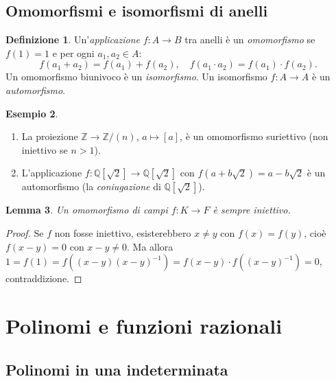\documentclass[11pt, a4paper]{book}
\theoremstyle{definition}
\newtheorem{definizione}{Definizione}[section]
\newtheorem{esempio}[definizione]{Esempio}
\theoremstyle{plain}
\newtheorem{lemma}[definizione]{Lemma}
\theoremstyle{remark}
\newcommand{\Z}{\mathbb{Z}}
\newcommand{\Q}{\mathbb{Q}}
\begin{document}
\subsection{Omomorfismi e isomorfismi di anelli}

\begin{defbox}
\begin{definizione}
Un'\emph{applicazione} $f \colon A \to B$ tra anelli è un \emph{omomorfismo} se $f(1) = 1$ e per ogni $a_1, a_2 \in A$:
\[
  f(a_1 + a_2) = f(a_1) + f(a_2), \quad f(a_1 \cdot a_2) = f(a_1) \cdot f(a_2).
\]
Un omomorfismo biunivoco è un \emph{isomorfismo}. Un isomorfismo $f \colon A \to A$ è un \emph{automorfismo}.
\end{definizione}
\end{defbox}

\begin{exbox}
\begin{esempio}
\begin{enumerate}
  \item La proiezione $\Z \to \Z/(n)$, $a \mapsto [a]$, è un omomorfismo suriettivo (non iniettivo se $n > 1$).
  \item L'applicazione $f \colon \Q[\sqrt{2}] \to \Q[\sqrt{2}]$ con $f(a + b\sqrt{2}) = a - b\sqrt{2}$ è un automorfismo (la \emph{coniugazione} di $\Q[\sqrt{2}]$).
\end{enumerate}
\end{esempio}
\end{exbox}

\begin{lemma}
Un omomorfismo di campi $f \colon K \to F$ è sempre iniettivo.
\end{lemma}

\begin{proof}
Se $f$ non fosse iniettivo, esisterebbero $x \neq y$ con $f(x) = f(y)$, cioè $f(x - y) = 0$ con $x - y \neq 0$. Ma allora $1 = f(1) = f((x-y)(x-y)^{-1}) = f(x-y) \cdot f((x-y)^{-1}) = 0$, contraddizione.
\end{proof}

\section{Polinomi e funzioni razionali}

\subsection{Polinomi in una indeterminata}
\end{document}

